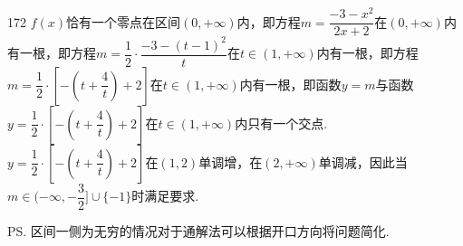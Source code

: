\begin{enumerate}
\begin{jieda}
\begin{enumerate}
\begin{dingautolist}{172}
            $f(x)$恰有一个零点在区间$(0, +\infty)$内，即方程$m = \dfrac{-3-x^2}{2x+2}$在$(0, +\infty)$内有一根，即方程$m = \dfrac{1}{2} \cdot \dfrac{-3-(t-1)^2}{t}$在$t \in (1, +\infty)$内有一根，即方程$m = \dfrac{1}{2} \cdot [-(t+\dfrac{4}{t})+2]$在$t \in (1, +\infty)$内有一根，即函数$y = m$与函数$y = \dfrac{1}{2} \cdot [-(t+\dfrac{4}{t})+2]$在$t \in (1, +\infty)$内只有一个交点.\\
            $y = \dfrac{1}{2} \cdot [-(t+\dfrac{4}{t})+2]$在$(1, 2)$单调增，在$(2, +\infty)$单调减，因此当$m \in (-\infty, -\dfrac{3}{2}] \cup \{-1\}$时满足要求.
        \end{dingautolist}
        \ps 区间一侧为无穷的情况对于通解法可以根据开口方向将问题简化.
    \end{enumerate}
    \end{jieda}
\end{enumerate}

